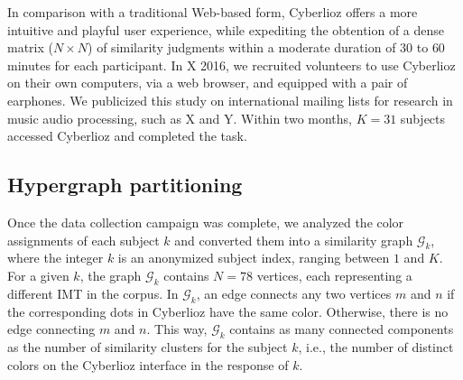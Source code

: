 \documentclass{bmcart}
\makeatletter
\newcommand*{\ie}{i.e.,\@\xspace}
\newcommand{\ipt}{IPT\xspace}
\makeatother
\begin{document}
In comparison with a traditional Web-based form, Cyberlioz offers a more intuitive and playful user experience, while expediting the obtention of a dense matrix ($N\times N$) of similarity judgments within a moderate duration of $30$ to $60$ minutes for each participant.
In X 2016, we recruited volunteers to use Cyberlioz on their own computers, via a web browser, and equipped with a pair of earphones. %
We publicized this study on international mailing lists for research in music audio processing, such as X and Y. %
Within two months, $K=31$ subjects accessed Cyberlioz and completed the task. %

\subsection*{Hypergraph partitioning}
Once the data collection campaign was complete, we analyzed the color assignments of each subject $k$ and converted them into a similarity graph $\mathcal{G}_k$, where the integer $k$ is an anonymized subject index, ranging between $1$ and $K$.
For a given $k$, the graph $\mathcal{G}_k$ contains $N=78$ vertices, each representing a different IMT in the corpus.
In $\mathcal{G}_k$, an edge connects any two vertices $m$ and $n$ if the corresponding dots in Cyberlioz have the same color.
Otherwise, there is no edge connecting $m$ and $n$.
This way, $\mathcal{G}_k$ contains as many connected components as the number of similarity clusters for the subject $k$, \ie{} the number of distinct colors on the Cyberlioz interface in the response of $k$.

\end{document}
